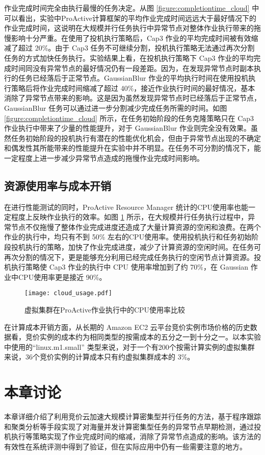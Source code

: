 作业完成时间完全由执行最慢的任务决定。从图 \ref{figure:completiontime_cloud} 中可以看出，实验中ProActive计算框架的平均作业完成时间远远大于最好情况下的作业完成时间，这说明在大规模并行任务执行中异常节点对整体作业执行带来的拖慢影响十分严重。在使用了投机执行策略后，Cap3 作业的平均完成时间被有效缩减了超过 20\%。由于 Cap3 任务不可继续分割，投机执行策略无法通过再次分割任务的方式加快任务执行。实验结果上看，在投机执行策略下 Cap3 作业的平均完成时间同没有异常节点的最好情况仍有一段差距。因为，在发现异常节点时副本执行的任务已经落后于正常节点。GaussianBlur 作业的平均执行时间在使用投机执行策略后将作业完成时间缩减了超过 40\%，接近作业执行时间的最好情况，基本消除了异常节点带来的影响。这是因为虽然发现异常节点时已经落后于正常节点，GaussianBlur 任务可以通过进一步分割减少完成任务所需的时间。如图 \ref{figure:completiontime_cloud} 所示，在任务初始阶段的任务克隆策略只在 Cap3 作业执行中带来了少量的性能提升，对于 GaussianBlur 作业则完全没有效果。虽然任务初始阶段的投机执行有潜在的性能优化机会，但由于异常节点出现的不确定和偶发性其所能带来的性能提升在实验中并不明显。在任务不可分割的情况下，能一定程度上进一步减少异常节点造成的拖慢作业完成时间影响。

\subsection{资源使用率与成本开销}
\label{sec:no2_usage}
在进行性能测试的同时，ProActive Resource Manager 统计的CPU使用率也能一定程度上反映作业执行的效率。如图 \ref{figure:resourceusage_cloud} 所示，在大规模并行任务执行过程中，异常节点不仅拖慢了整体作业完成进度还造成了大量计算资源的空闲和浪费。在两个作业的执行中，均只有不到 50\% 左右的CPU使用率。使用投机执行和任务初始阶段投机执行的策略，加快了作业完成进度，减少了计算资源的空闲时间。在任务可再次分割的情况下，更是能够充分利用已经完成任务执行的空闲节点计算资源。投机执行策略使 Cap3 作业的执行中 CPU 使用率增加到了约 70\%，在 Gaussian 作业中CPU使用率更是接近 90\%。
\begin{figure}
  \centering
  \texttt{[image: cloud\_usage.pdf]}
  \caption{虚拟集群在ProActive作业执行中的CPU使用率比较}
  \label{figure:resourceusage_cloud}
\end{figure}

在计算成本开销方面，从长期的 Amazon EC2 云平台竞价实例市场价格的历史数据看，竞价实例的成本约为相同类型的按需成本的五分之一到十分之一。以本实验中使用的``linux.m1.small'' 类型来说，对于一个有200个按需计算实例的虚拟集群来说，36个竞价实例的计算成本只有约虚拟集群成本的 3\%。

\section{本章讨论}
本章详细介绍了利用竞价云加速大规模计算密集型并行任务的方法，基于程序跟踪和聚类分析等手段实现了对海量并发计算密集型任务的异常节点早期检测，通过投机执行等策略实现了作业完成时间的缩减，消除了异常节点造成的影响。该方法的有效性在系统评测中得到了验证，但在实际应用中仍有一些需要注意的地方。

